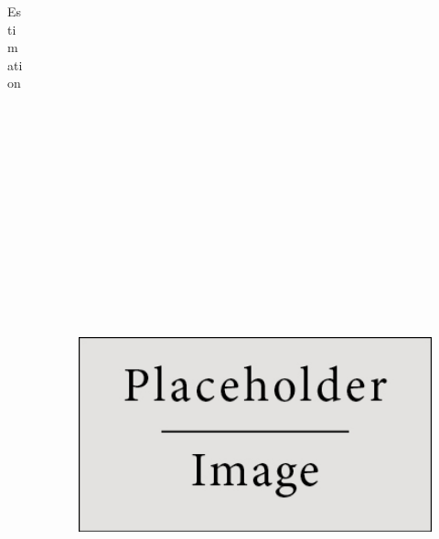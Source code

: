 \documentclass{beamer}
\newlength{\onecolwid}
\newlength{\twocolwid}
\begin{document}
\begin{frame}[t]
\begin{columns}[t]
\begin{column}{\onecolwid}
\begin{block}{Estimation}
\end{block}

\end{column}  %



\spacercolumn
\begin{column}{\twocolwid}  %



\vspace{-1.5cm}
\begin{figure}
\includegraphics[width=\linewidth, height=25cm]{figure/placeholder.jpg}

\end{figure}
\end{column}
\end{columns}
\end{frame}
\end{document}
